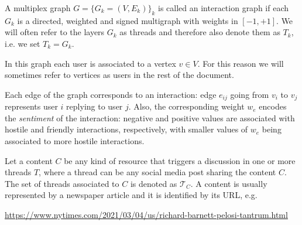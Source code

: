 \begin{definition}
	A multiplex graph $G = \{G_k = (V,E_k) \}_k$ is called an interaction graph
	if each $G_k$ is a directed, weighted and signed multigraph with weights in
	$[-1,+1]$. We will often refer to the layers $G_k$ as
	threads and therefore also denote them as $T_k$, i.e. we set $T_k = G_k$.
\end{definition}

In this graph each user is associated to a vertex $v \in V$. For this reason we
will sometimes refer to vertices as users in the rest of the document.

Each edge of the graph corresponds to an interaction: edge $e_{ij}$
going from $v_i$ to $v_j$ represents user $i$ replying to
user $j$. Also, the corresponding weight $w_e$ encodes the \emph{sentiment} of
the interaction: negative and positive values are associated with hostile and
friendly interactions, respectively, with smaller values of $w_e$ being
associated to more hostile interactions.




Let a content $C$ be any kind of resource that triggers a discussion in one or
more threads $T$, where a thread can be any social media post sharing the content $C$. The set of threads associated to $C$ is denoted as
$\mathcal{T}_{C} $. A content is usually represented by a newspaper article and
it is identified by its URL, e.g.

	{\footnotesize
		\begin{center}
			\url{https://www.nytimes.com/2021/03/04/us/richard-barnett-pelosi-tantrum.html}
		\end{center}
	}

